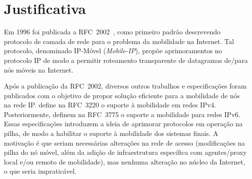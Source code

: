 \documentclass[	12pt, Times, openright, twoside, a4paper, english, brazil]{abntex2}
\begin{document}
\section{Justificativa}

Em 1996 foi publicada a RFC~2002~\cite{perkins1996}, como primeiro padrão descrevendo protocolo de camada de rede para o problema da mobilidade na Internet. Tal protocolo, denominado IP-Móvel (\textit{Mobile-IP}), propõe aprimoramentos no protocolo IP de modo a permitir roteamento transparente de datagramas de/para nós móveis na Internet. 

Após a publicação da RFC~2002, diversos outros trabalhos e  especificações foram publicados com o objetivo de propor solução eficiente para a mobilidade de nós na rede IP.   define na RFC~3220 o suporte à mobilidade em redes IPv4. Posteriormente,  definem na RFC~3775 o suporte a mobilidade para redes IPv6. Essas especificações introduzem a ideia de aprimorar protocolos em operação na pilha, de modo a habilitar o suporte à mobilidade dos sistemas finais. A motivação é que seriam necessárias alterações na rede de acesso (modificações na pilha do nó móvel, além da adição de infraestrutura específica com agentes/proxy local e/ou remoto de mobilidade), mas nenhuma alteração no núcleo da Internet, o que seria impraticável. 
\end{document}
